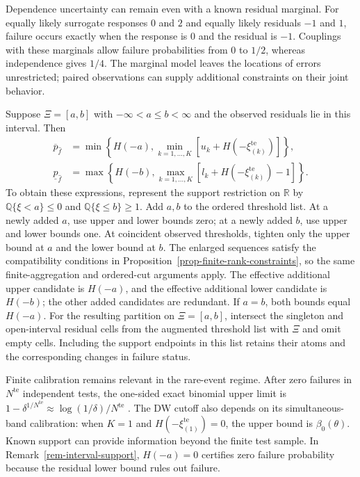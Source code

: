 \documentclass[review,11pt,3p,authoryear,nopreprintline]{elsarticle}
\begin{document}
Dependence uncertainty can remain even with a known residual marginal. For equally likely surrogate responses $0$ and $2$ and equally likely residuals $-1$ and $1$, failure occurs exactly when the response is $0$ and the residual is $-1$. Couplings with these marginals allow failure probabilities from $0$ to $1/2$, whereas independence gives $1/4$. The marginal model leaves the locations of errors unrestricted; paired observations can supply additional constraints on their joint behavior.

\begin{remark}
  \label{rem-interval-support}
  Suppose $\Xi=[a,b]$ with $-\infty<a\le b<\infty$ and the observed residuals lie in this interval. Then
  \begin{align*}
    \overline p_{\hat f}
    &=\min\left\{H(-a),\min_{k=1,\ldots,K}[u_k+H\left(-\xi_{(k)}^{\mathrm{te}}\right)]\right\},\\
    \underline p_{\hat f}
    &=\max\left\{H(-b),\max_{k=1,\ldots,K}[l_k+H\left(-\xi_{(k)}^{\mathrm{te}}\right)-1]\right\}.
  \end{align*}
  To obtain these expressions, represent the support restriction on $\mathbb R$ by
  $\mathbb Q\{\xi<a\}\le0$ and $\mathbb Q\{\xi\le b\}\ge1$.
  Add $a,b$ to the ordered threshold list. At a newly added $a$, use upper and lower bounds zero; at a newly added $b$, use upper and lower bounds one. At coincident observed thresholds, tighten only the upper bound at $a$ and the lower bound at $b$. The enlarged sequences satisfy the compatibility conditions in Proposition~\ref{prop-finite-rank-constraints}, so the same finite-aggregation and ordered-cut arguments apply. The effective additional upper candidate is $H(-a)$, and the effective additional lower candidate is $H(-b)$; the other added candidates are redundant. If $a=b$, both bounds equal $H(-a)$. For the resulting partition on $\Xi=[a,b]$, intersect the singleton and open-interval residual cells from the augmented threshold list with $\Xi$ and omit empty cells. Including the support endpoints in this list retains their atoms and the corresponding changes in failure status.
\end{remark}

Finite calibration remains relevant in the rare-event regime. After zero failures in $N^{\mathrm{te}}$ independent tests, the one-sided exact binomial upper limit is $1-\delta^{1/N^{\mathrm{te}}}\approx\log(1/\delta)/N^{\mathrm{te}}$ \citep{C.P34}. The DW cutoff also depends on its simultaneous-band calibration: when $K=1$ and $H\left(-\xi_{(1)}^{\mathrm{te}}\right)=0$, the upper bound is $\beta_0(\theta)$. Known support can provide information beyond the finite test sample. In Remark~\ref{rem-interval-support}, $H(-a)=0$ certifies zero failure probability because the residual lower bound rules out failure.
\end{document}
